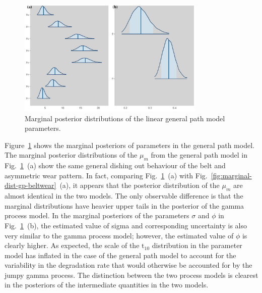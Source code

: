 \begin{figure}
  \centering
  \includegraphics[width=0.8\textwidth]{figures/ch-6/marginal_post_lm.pdf}
  \caption{Marginal posterior distributions of the linear general path model parameters.}
  \label{fig:marginal-dist-lm-beltwear}
\end{figure}

Figure~\ref{fig:marginal-dist-lm-beltwear} shows the marginal posteriors of parameters in the general path model. The marginal posterior distributions of the $\mu_m$ from the general path model in Fig.~\ref{fig:marginal-dist-lm-beltwear}~(a) show the same general dishing out behaviour of the belt and asymmetric wear pattern. In fact, comparing Fig.~\ref{fig:marginal-dist-lm-beltwear}~(a) with Fig.~\ref{fig:marginal-dist-gp-beltwear}~(a), it appears that the posterior distribution of the $\mu_m$ are almost identical in the two models. The only observable difference is that the marginal distributions have heavier upper tails in the posterior of the gamma process model. In the marginal posteriors of the parameters $\sigma$ and $\phi$ in Fig.~\ref{fig:marginal-dist-lm-beltwear}~(b), the estimated value of sigma and corresponding uncertainty is also very similar to the gamma process model; however, the estimated value of $\phi$ is clearly higher. As expected, the scale of the $\mbox{t}_{10}$ distribution in the parameter model has inflated in the case of the general path model to account for the variability in the degradation rate that would otherwise be accounted for by the jumpy gamma process. The distinction between the two process models is clearest in the posteriors of the intermediate quantities in the two models.

